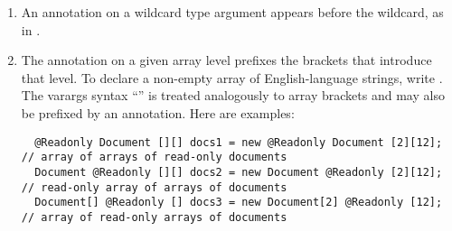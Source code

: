 \documentclass[10pt]{article}
\newcommand{\preverbnegspace}{\vspace{-5pt}}
\begin{document}
\begin{enumerate}


\item
  An annotation on a wildcard type argument appears before the wildcard,
  as in .


% 

\item
  The annotation on a given array level
  prefixes the brackets that introduce that level.  To declare
  a non-empty array of English-language strings, write .
  The varargs syntax ``'' is treated analogously to array brackets
  and may also be prefixed by an annotation.
%
  Here are examples:
\preverbnegspace
\begin{Verbatim}
  @Readonly Document [][] docs1 = new @Readonly Document [2][12]; // array of arrays of read-only documents
  Document @Readonly [][] docs2 = new Document @Readonly [2][12]; // read-only array of arrays of documents
  Document[] @Readonly [] docs3 = new Document[2] @Readonly [12]; // array of read-only arrays of documents
\end{Verbatim}


\end{enumerate}
\end{document}
